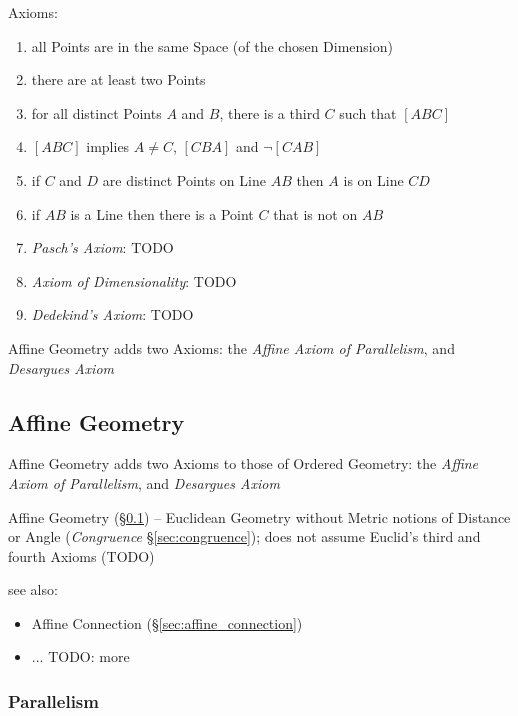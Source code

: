 Axioms:
\begin{enumerate}
  \item all Points are in the same Space (of the chosen Dimension)
  \item there are at least two Points
  \item for all distinct Points $A$ and $B$, there is a third $C$ such that
    $[ABC]$
  \item $[ABC]$ implies $A \neq C$, $[CBA]$ and $\neg[CAB]$
  \item if $C$ and $D$ are distinct Points on Line $AB$ then $A$ is on Line $CD$
  \item if $AB$ is a Line then there is a Point $C$ that is not on $AB$
  \item \emph{Pasch's Axiom}: TODO
  \item \emph{Axiom of Dimensionality}: TODO
  \item \emph{Dedekind's Axiom}: TODO
\end{enumerate}

Affine Geometry adds two Axioms: the \emph{Affine Axiom of Parallelism}, and
\emph{Desargues Axiom}



\subsection{Affine Geometry}\label{sec:affine_geometry}

Affine Geometry adds two Axioms to those of Ordered Geometry: the \emph{Affine
  Axiom of Parallelism}, and \emph{Desargues Axiom}

Affine Geometry (\S\ref{sec:affine_geometry}) -- Euclidean Geometry without
Metric notions of Distance or Angle (\emph{Congruence} \S\ref{sec:congruence});
does not assume Euclid's third and fourth Axioms (TODO)

see also:
\begin{itemize}
  \item Affine Connection (\S\ref{sec:affine_connection})
  \item ... TODO: more
\end{itemize}



\subsubsection{Parallelism}\label{sec:parallelism}

